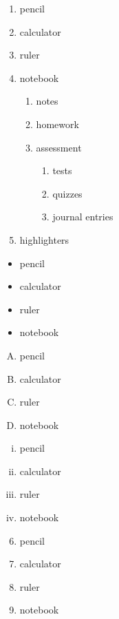 \documentclass[11pt]{article}
\begin{document}
\begin{enumerate}
\item pencil
\item calculator
\item ruler
\item notebook
	\begin{enumerate}
	\item notes
	\item homework
	\item assessment
		\begin{enumerate}
		\item tests
		\item quizzes
		\item journal entries
		\end{enumerate}
	\end{enumerate}
\item highlighters
\end{enumerate}

\vspace{1cm}

\begin{itemize}
\item pencil
\item calculator
\item ruler
\item notebook
\end{itemize}

\pagebreak
\vspace{1cm}

\begin{enumerate}[A.]
\item pencil
\item calculator
\item ruler
\item notebook
\end{enumerate}

\vspace{1cm}

\begin{enumerate}[i.]
\item pencil
\item calculator
\item ruler
\item notebook
\end{enumerate}


\vspace{1cm}

\begin{enumerate}\setcounter{enumi}{5} %
\item pencil
\item calculator
\item ruler
\item notebook
\end{enumerate}
\end{document}
